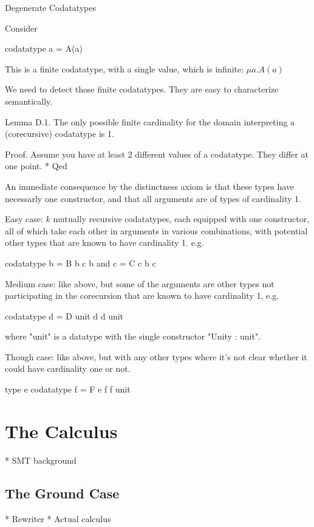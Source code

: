 Degenerate Codatatypes

    Consider

      codatatype a = A(a)

    This is a finite codatatype, with a single value, which is infinite:
    $\mu a. A(a)$
    
    We need to detect those finite codatatypes. They are easy to
    characterize semantically.

    Lemma D.1. The only possible finite cardinality for the domain interpreting
    a (corecursive) codatatype is 1.

    Proof.
      Assume you have at least 2 different values of a codatatype.
      They differ at one point.
      * 
    Qed

    An immediate consequence by the distinctness axiom is that these types have
    necessarly one constructor, and that all arguments are of types of
    cardinality 1.

    Easy case: $k$ mutually recursive codatatypes, each equipped with one
    constructor, all of which take each other in arguments in various
    combinations, with potential other types that are known to have cardinality
    1. e.g.

      codatatype b = B b c b
             and c = C c b c

    Medium case: like above, but some of the arguments are other types not
    participating in the corecursion that are known to have cardinality 1, e.g.

      codatatype d = D unit d d unit

    where "unit" is a datatype with the single constructor "Unity : unit".

    Though case: like above, but with any other types where it's not clear
    whether it could have cardinality one or not.

      type e
      codatatype f = F e f f unit


\section{The Calculus}
\label{sec:the-calculus}

  * SMT background

\subsection{The Ground Case}

  * Rewriter
  * Actual calculus

